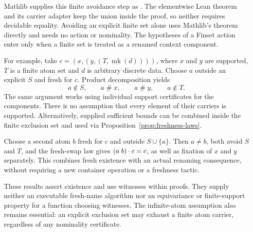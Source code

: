 Mathlib supplies this finite avoidance step as
. The elementwise Lean theorem
 and its carrier adapter
 keep the union inside the proof, so neither
requires decidable equality. Avoiding an explicit finite set alone uses
Mathlib's theorem directly and needs no action or nominality. The hypotheses
of a Finset action enter only when a finite set is treated as a renamed
context component.

For example, take
$c=(x,(y,(T,\operatorname{mk}(d))))$, where $x$ and $y$ are supported,
$T$ is a finite atom set and $d$ is arbitrary discrete data. Choose $a$
outside an explicit $S$ and fresh for $c$. Product decomposition yields
\[
  a\notin S,\qquad a\mathrel{\#}x,\qquad
  a\mathrel{\#}y,\qquad a\notin T.
\]
The same argument works using individual support certificates for the
components. There is no assumption that every element of their carriers
is supported. Alternatively, supplied sufficient bounds can be combined
inside the finite exclusion set and used via Proposition~\ref{prop:freshness-laws}.

Choose a second atom $b$ fresh for $c$ and outside $S\cup\{a\}$. Then
$a\ne b$, both avoid $S$ and $T$, and the fresh-swap law gives
$(a\;b)\mathbin{\cdot} c=c$, as well as fixation of $x$ and $y$ separately.
This combines fresh existence with an actual renaming consequence, without
requiring a new container operation or a freshness tactic.

These results assert existence and use witnesses within proofs. They supply
neither an executable fresh-name algorithm nor an equivariance or finite-support
property for a function choosing witnesses. The infinite-atom assumption
also remains essential: an explicit exclusion set may exhaust a finite
atom carrier, regardless of any nominality certificate.
